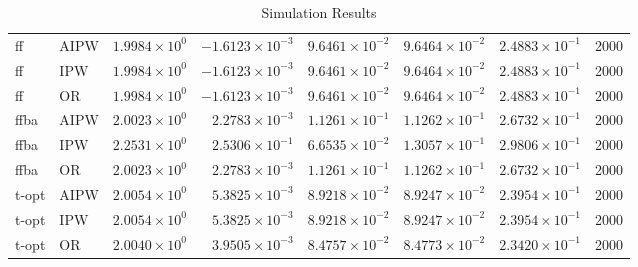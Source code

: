 \begin{table}[ht]
\begin{tabular}{llrrrrrr}
   \midrule
ff & AIPW & $1.9984 \times 10^{0}$ & $-1.6123 \times 10^{-3}$ & $9.6461 \times 10^{-2}$ & $9.6464 \times 10^{-2}$ & $2.4883 \times 10^{-1}$ & 2000 \\ 
  ff & IPW & $1.9984 \times 10^{0}$ & $-1.6123 \times 10^{-3}$ & $9.6461 \times 10^{-2}$ & $9.6464 \times 10^{-2}$ & $2.4883 \times 10^{-1}$ & 2000 \\ 
  ff & OR & $1.9984 \times 10^{0}$ & $-1.6123 \times 10^{-3}$ & $9.6461 \times 10^{-2}$ & $9.6464 \times 10^{-2}$ & $2.4883 \times 10^{-1}$ & 2000 \\ 
   \midrule
ffba & AIPW & $2.0023 \times 10^{0}$ & $2.2783 \times 10^{-3}$ & $1.1261 \times 10^{-1}$ & $1.1262 \times 10^{-1}$ & $2.6732 \times 10^{-1}$ & 2000 \\ 
  ffba & IPW & $2.2531 \times 10^{0}$ & $2.5306 \times 10^{-1}$ & $6.6535 \times 10^{-2}$ & $1.3057 \times 10^{-1}$ & $2.9806 \times 10^{-1}$ & 2000 \\ 
  ffba & OR & $2.0023 \times 10^{0}$ & $2.2783 \times 10^{-3}$ & $1.1261 \times 10^{-1}$ & $1.1262 \times 10^{-1}$ & $2.6732 \times 10^{-1}$ & 2000 \\ 
   \midrule
t-opt & AIPW & $2.0054 \times 10^{0}$ & $5.3825 \times 10^{-3}$ & $8.9218 \times 10^{-2}$ & $8.9247 \times 10^{-2}$ & $2.3954 \times 10^{-1}$ & 2000 \\ 
  t-opt & IPW & $2.0054 \times 10^{0}$ & $5.3825 \times 10^{-3}$ & $8.9218 \times 10^{-2}$ & $8.9247 \times 10^{-2}$ & $2.3954 \times 10^{-1}$ & 2000 \\ 
  t-opt & OR & $2.0040 \times 10^{0}$ & $3.9505 \times 10^{-3}$ & $8.4757 \times 10^{-2}$ & $8.4773 \times 10^{-2}$ & $2.3420 \times 10^{-1}$ & 2000 \\ 
   \bottomrule
\end{tabular}
\caption{Simulation Results} 
\label{tab:results}
\end{table}
